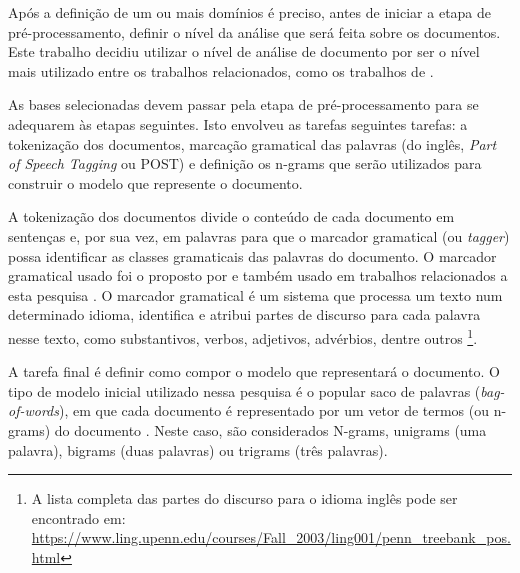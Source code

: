 

Após a definição de um ou mais domínios é preciso, antes de iniciar a etapa de pré-processamento, definir o nível da análise que será feita sobre os documentos. Este trabalho decidiu utilizar o nível de análise de documento por ser o nível mais utilizado entre os trabalhos relacionados, como os trabalhos de . 

As bases selecionadas devem passar pela etapa de pré-processamento para se adequarem às etapas seguintes. Isto envolveu as tarefas seguintes tarefas:    a tokenização dos documentos, marcação gramatical das palavras (do inglês, \textit{Part of Speech Tagging} ou POST) e definição os n-grams que serão utilizados para construir o modelo que represente o documento. 

A tokenização dos documentos divide o conteúdo de cada documento em sentenças e, por sua vez, em palavras para que o marcador gramatical (ou \textit{tagger}) possa identificar as classes gramaticais das palavras do documento. O marcador gramatical usado foi o proposto por  e também usado em trabalhos relacionados a esta pesquisa \cite{chaovalit2005movie, taboada2008extracting, taboada2011lexicon}. O marcador gramatical é um sistema que processa um texto num determinado idioma, identifica e atribui partes de discurso para cada palavra nesse texto, como substantivos, verbos, adjetivos, advérbios, dentre outros \footnote{A lista completa das partes do discurso para o idioma inglês pode ser encontrado em: \url{https://www.ling.upenn.edu/courses/Fall_2003/ling001/penn_treebank_pos.html}}. 

A tarefa final é definir como compor o modelo que representará o documento. O tipo de modelo inicial utilizado nessa pesquisa é o popular saco de palavras (\textit{bag-of-words}), em que cada documento é representado por um vetor de termos (ou n-grams) do documento \cite{moraes2012document}. Neste caso, são considerados N-grams, unigrams (uma palavra), bigrams (duas palavras) ou trigrams (três palavras). 

